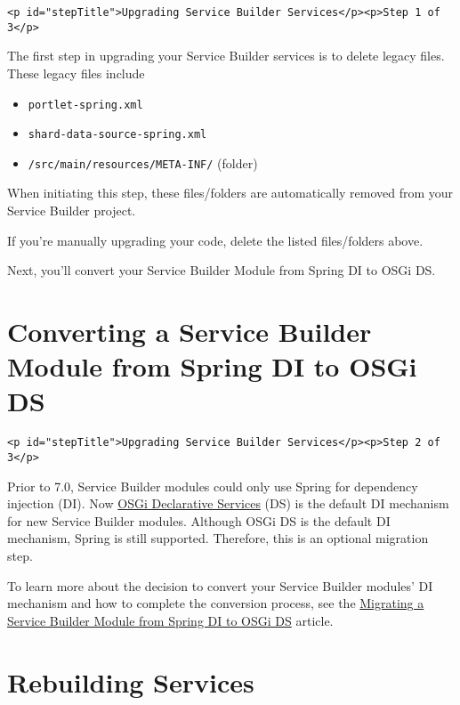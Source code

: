 \begin{verbatim}
<p id="stepTitle">Upgrading Service Builder Services</p><p>Step 1 of 3</p>
\end{verbatim}

The first step in upgrading your Service Builder services is to delete
legacy files. These legacy files include

\begin{itemize}
\tightlist
\item
  \texttt{portlet-spring.xml}
\item
  \texttt{shard-data-source-spring.xml}
\item
  \texttt{/src/main/resources/META-INF/} (folder)
\end{itemize}

When initiating this step, these files/folders are automatically removed
from your Service Builder project.

If you're manually upgrading your code, delete the listed files/folders
above.

Next, you'll convert your Service Builder Module from Spring DI to OSGi
DS.

\chapter{Converting a Service Builder Module from Spring DI to OSGi
DS}\label{converting-a-service-builder-module-from-spring-di-to-osgi-ds}

\begin{verbatim}
<p id="stepTitle">Upgrading Service Builder Services</p><p>Step 2 of 3</p>
\end{verbatim}

Prior to 7.0, Service Builder modules could only use Spring for
dependency injection (DI). Now
\href{/docs/7-2/frameworks/-/knowledge_base/f/declarative-services}{OSGi
Declarative Services} (DS) is the default DI mechanism for new Service
Builder modules. Although OSGi DS is the default DI mechanism, Spring is
still supported. Therefore, this is an optional migration step.

To learn more about the decision to convert your Service Builder
modules' DI mechanism and how to complete the conversion process, see
the
\href{/docs/7-2/appdev/-/knowledge_base/a/migrating-a-service-builder-module-from-spring-di-to-osgi-ds}{Migrating
a Service Builder Module from Spring DI to OSGi DS} article.

\chapter{Rebuilding Services}\label{rebuilding-services}

